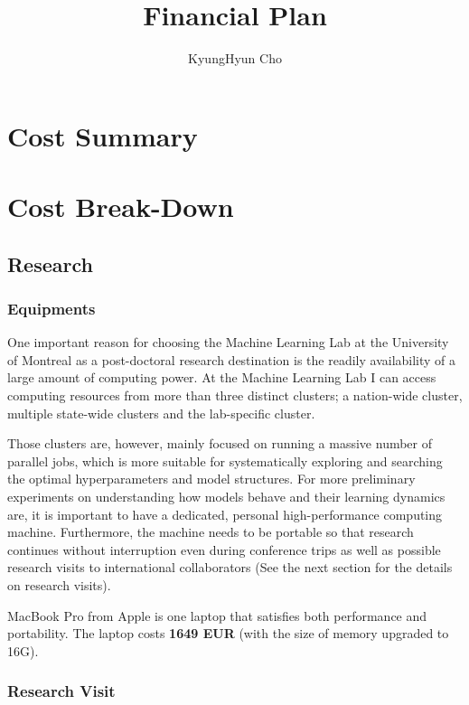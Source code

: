\documentclass[11pt, oneside]{essay}
\title{Financial Plan}
\author{KyungHyun Cho}
\begin{document}
\maketitle

\section{Cost Summary}



\section{Cost Break-Down}

\subsection{Research}

\subsubsection{Equipments}


One important reason for choosing the Machine Learning Lab at the
University of Montreal as a post-doctoral research destination is
the readily availability of a large amount of computing power. At
the Machine Learning Lab I can access computing resources from
more than three distinct clusters; a nation-wide cluster,
multiple state-wide clusters and the lab-specific cluster.

Those clusters are, however, mainly focused on running a massive
number of parallel jobs, which is more suitable for
systematically exploring and searching the optimal
hyperparameters and model structures. For more preliminary
experiments on understanding how models behave and their learning
dynamics are, it is important to have a dedicated, personal
high-performance computing machine.  Furthermore, the machine
needs to be portable so that research continues without
interruption even during conference trips as well as possible
research visits to international collaborators (See the next
section for the details on research visits).

MacBook Pro from Apple is one laptop that satisfies both
performance and portability. The laptop costs \textbf{1649 EUR}
(with the size of memory upgraded to 16G).



\subsubsection{Research Visit}
\end{document}

